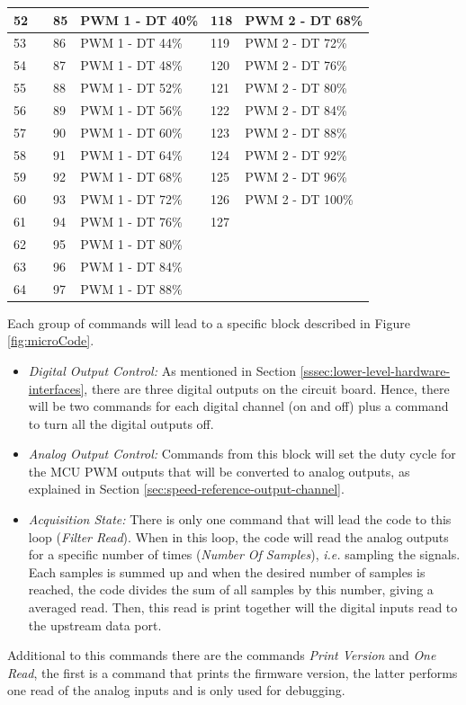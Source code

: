 \begin{table}[h!]
\begin{tabular}{|l|l|l|l|l|l|}
		52 &  & 85 & PWM 1 - DT 40\% & 118 & PWM 2 - DT 68\% \\ \hline
		53 &  & 86 & PWM 1 - DT 44\% & 119 & PWM 2 - DT 72\% \\ \hline
		54 &  & 87 & PWM 1 - DT 48\% & 120 & PWM 2 - DT 76\% \\ \hline
		55 &  & 88 & PWM 1 - DT 52\% & 121 & PWM 2 - DT 80\% \\ \hline
		56 &  & 89 & PWM 1 - DT 56\% & 122 & PWM 2 - DT 84\% \\ \hline
		57 &  & 90 & PWM 1 - DT 60\% & 123 & PWM 2 - DT 88\% \\ \hline
		58 &  & 91 & PWM 1 - DT 64\% & 124 & PWM 2 - DT 92\% \\ \hline
		59 &  & 92 & PWM 1 - DT 68\% & 125 & PWM 2 - DT 96\% \\ \hline
		60 &  & 93 & PWM 1 - DT 72\% & 126 & PWM 2 - DT 100\% \\ \hline
		61 &  & 94 & PWM 1 - DT 76\% & 127 &  \\ \hline
		62 &  & 95 & PWM 1 - DT 80\% &  &  \\ \hline
		63 &  & 96 & PWM 1 - DT 84\% &  &  \\ \hline
		64 &  & 97 & PWM 1 - DT 88\% &  &  \\ \hline
		\end{tabular}
	\end{table}


	Each group of commands will lead to a specific block described in Figure \ref{fig:microCode}.

	\begin{itemize}
		\item \textit{Digital Output Control:} As mentioned in Section \ref{sssec:lower-level-hardware-interfaces}, there are three digital outputs on the circuit board. Hence, there will be two commands for each digital channel (on and off) plus a command to turn all the digital outputs off. 
		\item \textit{Analog Output Control:} Commands from this block will set the duty cycle for the MCU PWM outputs that will be converted to analog outputs, as explained in Section \ref{sec:speed-reference-output-channel}.
		\item \textit{Acquisition State: } There is only one command that will lead the code to this loop (\textit{Filter Read}). When in this loop, the code will read the analog outputs for a specific number of times (\textit{Number Of Samples}), \textit{i.e.} sampling the signals. Each samples is summed up and when the desired number of samples is reached, the code divides the sum of all samples by this number, giving a averaged read. Then, this read is print together will the digital inputs read to the upstream data port.
	\end{itemize}

	Additional to this commands there are the commands \textit{Print Version} and \textit{One Read}, the first is a command that prints the firmware version, the latter performs one read of the analog inputs and is only used for debugging.
